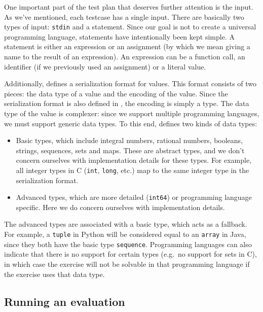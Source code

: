 \documentclass[5p,number]{elsarticle}
\begin{document}
    One important part of the test plan that deserves further attention is the input.
    As we've mentioned, each testcase has a single input.
    There are basically two types of input: \texttt{stdin} and a statement.
    Since our goal is not to create a universal programming language, statements have intentionally been kept simple.
    A statement is either an expression or an assignment (by which we mean giving a name to the result of an expression).
    An expression can be a function call, an identifier (if we previously used an assignment) or a literal value.

    Additionally, \tested{} defines a serialization format for values.
    This format consists of two pieces: the data type of a value and the encoding of the value.
    Since the serialization format is also defined in , the encoding is simply a  type.
    The data type of the value is complexer: since we support multiple programming languages, we must support generic data types.
    To this end, \tested{} defines two kinds of data types:

    \begin{itemize}
        \item Basic types, which include integral numbers, rational numbers, booleans, strings, sequences, sets and maps.
        These are abstract types, and we don't concern ourselves with implementation details for these types.
        For example, all integer types in C (\texttt{int}, \texttt{long}, etc.) map to the same integer type in the serialization format.
        \item Advanced types, which are more detailed (\texttt{int64}) or programming language specific.
        Here we do concern ourselves with implementation details.
    \end{itemize}

    The advanced types are associated with a basic type, which acts as a fallback.
    For example, a \texttt{tuple} in Python will be considered equal to an \texttt{array} in Java, since they both have the basic type \texttt{sequence}.
    Programming languages can also indicate that there is no support for certain types (e.g.\ no support for sets in C), in which case the exercise will not be solvable in that programming language if the exercise uses that data type.


    \subsection{Running an evaluation}\label{subsec:running-an-evaluation}
\end{document}
